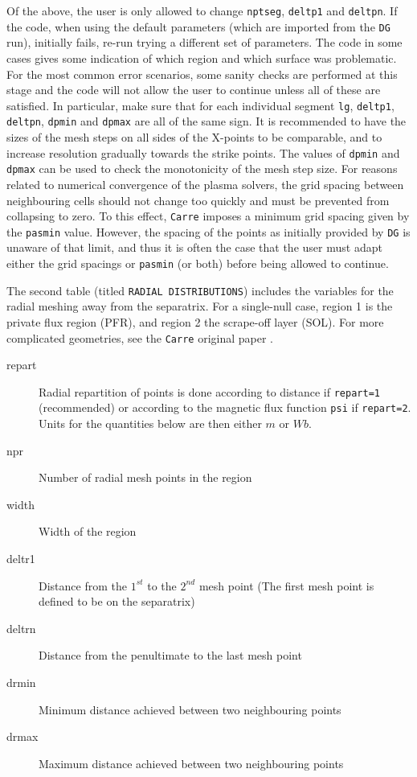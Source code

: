 \documentclass[a4paper,10pt]{report}
\begin{document}
Of the above, the user is only allowed to change {\tt nptseg}, {\tt deltp1} and {\tt deltpn}. If the code, when using the default parameters (which are imported from the {\tt DG} run), initially fails, re-run trying a different set of parameters. The code in some cases gives some indication of which region and which surface was problematic. For the most common error scenarios, some sanity checks are performed at this stage and the code will not allow the user to continue unless all of these are satisfied. In particular, make sure that for each individual segment {\tt lg}, {\tt deltp1}, {\tt deltpn}, {\tt dpmin} and {\tt dpmax} are all of the same sign. It is recommended to have the sizes of the mesh steps on all sides of the X-points to be comparable, and to increase resolution gradually towards the strike points. The values of {\tt dpmin} and {\tt dpmax} can be used to check the monotonicity of the mesh step size. For reasons related to numerical convergence of the plasma solvers, the grid spacing between neighbouring cells should not change too quickly and must be prevented from collapsing to zero. To this effect, {\tt Carre} imposes a minimum grid spacing given by the {\tt pasmin} value. However, the spacing of the points as initially provided by {\tt DG} is unaware of that limit, and thus it is often the case that the user must adapt either the grid spacings or {\tt pasmin} (or both) before being allowed to continue.

The second table
(titled {\tt RADIAL DISTRIBUTIONS}) includes the variables for the radial
meshing away from the separatrix. For a single-null case, region 1 is the
private flux region (PFR), and region 2 the scrape-off layer (SOL).
For more complicated geometries, see the {\tt Carre} original paper
\cite{Marchand1996}.

\begin{description}
  \item[repart] Radial repartition of points is done according
to distance if {\tt repart=1} (recommended) or according to the magnetic flux function {\tt psi} if {\tt repart=2}. Units for the quantities below are then
either $m$ or $Wb$.
  \item[npr] Number of radial mesh points in the region
  \item[width] Width of the region
  \item[deltr1] Distance from the $1^{st}$ to the $2^{nd}$ mesh point (The first mesh point is defined to be on the separatrix)
  \item[deltrn] Distance from the penultimate to the last mesh point
  \item[drmin] Minimum distance achieved between two neighbouring points
  \item[drmax] Maximum distance achieved between two neighbouring points
\end{description}
\end{document}
